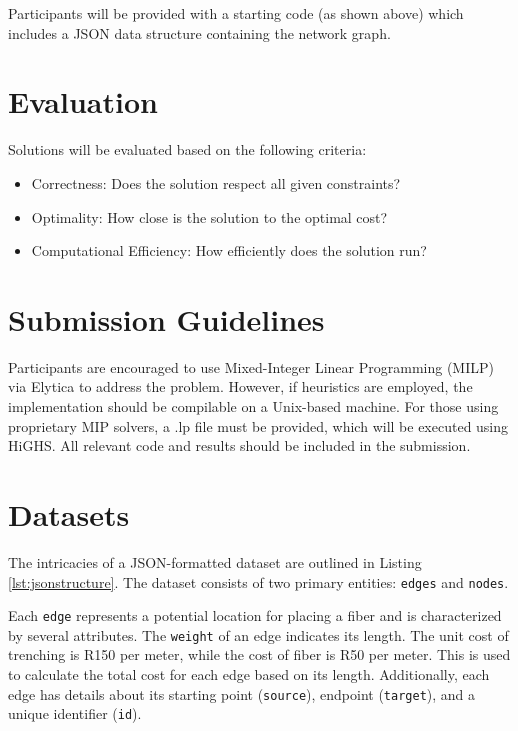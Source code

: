 \documentclass{article}
\begin{document}
Participants will be provided with a starting code (as shown above) which includes a JSON data structure containing the network graph.

\section{Evaluation}
Solutions will be evaluated based on the following criteria:
\begin{itemize}
    \item Correctness: Does the solution respect all given constraints?
    \item Optimality: How close is the solution to the optimal cost?
    \item Computational Efficiency: How efficiently does the solution run?
\end{itemize}

\section{Submission Guidelines}
Participants are encouraged to use Mixed-Integer Linear Programming (MILP) via Elytica to address the problem. However, if heuristics are employed, the implementation should be compilable on a Unix-based machine. For those using proprietary MIP solvers, a .lp file must be provided, which will be executed using HiGHS. All relevant code and results should be included in the submission.

\section{Datasets}
The intricacies of a JSON-formatted dataset are outlined in Listing \ref{lst:jsonstructure}. The dataset consists of two primary entities: \texttt{edges} and \texttt{nodes}.

Each \texttt{edge} represents a potential location for placing a fiber and is characterized by several attributes. The \texttt{weight} of an edge indicates its length. The unit cost of trenching is R150 per meter, while the cost of fiber is R50 per meter. This is used to calculate the total cost for each edge based on its length. Additionally, each edge has details about its starting point (\texttt{source}), endpoint (\texttt{target}), and a unique identifier (\texttt{id}).
\end{document}
